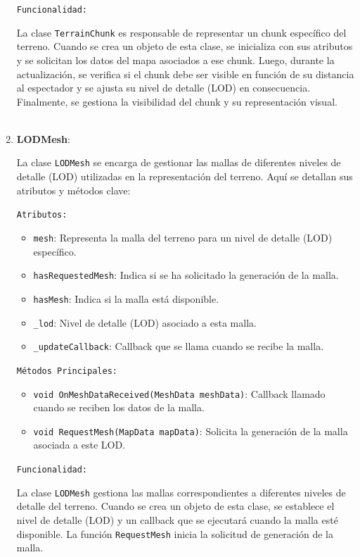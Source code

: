 \begin{enumerate}
    \texttt{Funcionalidad:}

    La clase \texttt{TerrainChunk} es responsable de representar un chunk específico del terreno. Cuando se crea un objeto de esta clase, se inicializa con sus atributos y se solicitan los datos del mapa asociados a ese chunk. Luego, durante la actualización, se verifica si el chunk debe ser visible en función de su distancia al espectador y se ajusta su nivel de detalle (LOD) en consecuencia. Finalmente, se gestiona la visibilidad del chunk y su representación visual.\\
    \\

    \item \textbf{LODMesh}:

    La clase \texttt{LODMesh} se encarga de gestionar las mallas de diferentes niveles de detalle (LOD) utilizadas en la representación del terreno. Aquí se detallan sus atributos y métodos clave:

    \texttt{Atributos:}

    \begin{itemize}
        \item \texttt{mesh}: Representa la malla del terreno para un nivel de detalle (LOD) específico.
        \item \texttt{hasRequestedMesh}: Indica si se ha solicitado la generación de la malla.
        \item \texttt{hasMesh}: Indica si la malla está disponible.
        \item \texttt{\_lod}: Nivel de detalle (LOD) asociado a esta malla.
        \item \texttt{\_updateCallback}: Callback que se llama cuando se recibe la malla.
    \end{itemize}

    \texttt{Métodos Principales:}

    \begin{itemize}
        \item \texttt{void OnMeshDataReceived(MeshData meshData)}: Callback llamado cuando se reciben los datos de la malla.
        \item \texttt{void RequestMesh(MapData mapData)}: Solicita la generación de la malla asociada a este LOD.
    \end{itemize}

    \texttt{Funcionalidad:}

    La clase \texttt{LODMesh} gestiona las mallas correspondientes a diferentes niveles de detalle del terreno. Cuando se crea un objeto de esta clase, se establece el nivel de detalle (LOD) y un callback que se ejecutará cuando la malla esté disponible. La función \texttt{RequestMesh} inicia la solicitud de generación de la malla.\\
    \\


\end{enumerate}
